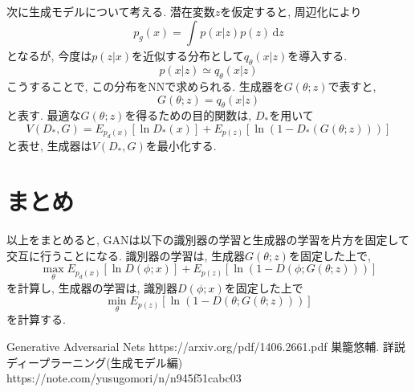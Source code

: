 \documentclass[twocolumn]{jarticle}
\begin{document}
次に生成モデルについて考える. 潜在変数${z}$を仮定すると, 周辺化により
\begin{equation}
  p_g(x) = \int_{}^{} p(x|z)p(z)\,\mathrm{d}z
\end{equation}
となるが, 今度は${p(z|x)}$を近似する分布として${q_\theta(x|z)}$を導入する.
\begin{equation}
  p(x|z) \simeq q_\theta(x|z)
\end{equation}
こうすることで, この分布をNNで求められる. 生成器を${G(\theta;z)}$で表すと,
\begin{equation}
  G(\theta;z) = q_\theta(x|z)
\end{equation}
と表す. 最適な${G(\theta;z)}$を得るための目的関数は, ${D_\ast}$を用いて
\begin{equation}
  V(D_\ast, G) = E_{p_d(x)}[\ln D_\ast(x)] + E_{p(z)}[\ln(1 - D_\ast(G(\theta; z)))]
\end{equation}
と表せ, 生成器は${V(D_\ast, G)}$を最小化する.

\section{まとめ}
以上をまとめると, GANは以下の識別器の学習と生成器の学習を片方を固定して交互に行うことになる. 識別器の学習は, 生成器${G(\theta;z)}$を固定した上で,
\begin{equation}
  \max_\theta E_{p_d(x)}[\ln D(\phi; x)] + E_{p(z)}[\ln (1 - D(\phi; G(\theta; z)))]
\end{equation}
を計算し, 生成器の学習は, 識別器${D(\phi;x)}$を固定した上で
\begin{equation}
  \min_\theta E_{p(z)} [\ln (1 - D(\theta; G(\theta; z)))]
\end{equation}
を計算する.


\begin{thebibliography}{9}
   Generative Adversarial Nets https://arxiv.org/pdf/1406.2661.pdf
   巣籠悠輔. 詳説ディープラーニング(生成モデル編)　https://note.com/yusugomori/n/n945f51cabc03
\end{thebibliography}
\end{document}
